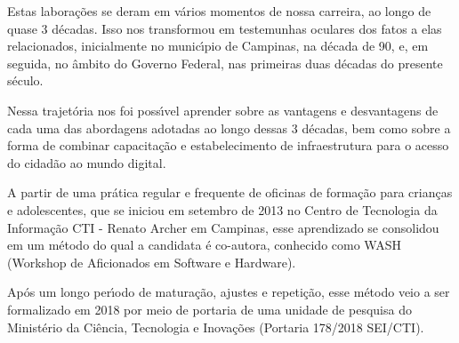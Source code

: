 \documentclass[
12pt,		%
openright,	%
twoside,  %
a4paper,			%
chapter=TITLE,		%
english,			%
french,				%
spanish,			%
brazil				%
]{USPSC-classe/USPSC}
\begin{document}
Estas labora\c{c}\~oes  se deram em v\'arios momentos de nossa carreira, ao longo de quase 3 d\'ecadas. Isso nos transformou em testemunhas oculares dos fatos a elas relacionados, inicialmente no  munic\'{\i}pio de Campinas, na d\'ecada de 90, e, em seguida, no \^ambito do Governo Federal, nas primeiras duas d\'ecadas do presente s\'eculo.

















Nessa trajet\'oria nos foi poss\'{\i}vel aprender sobre as vantagens e desvantagens de cada uma das abordagens adotadas ao longo dessas 3 d\'ecadas, bem como sobre a forma de combinar capacita\c{c}\~ao e estabelecimento de infraestrutura para o acesso do cidad\~ao ao mundo digital.

















A partir de uma pr\'atica regular e frequente de oficinas de forma\c{c}\~ao para  crian\c{c}as e adolescentes, que se iniciou em setembro de 2013 no Centro de Tecnologia da Informa\c{c}\~ao CTI - Renato Archer em Campinas, esse aprendizado se consolidou em um m\'etodo do qual a candidata \'e co-autora, conhecido como WASH (Workshop de Aficionados em Software e Hardware).

















Ap\'os um longo per\'{\i}odo de matura\c{c}\~ao, ajustes e repeti\c{c}\~ao, esse m\'etodo veio a ser formalizado em 2018 por meio de portaria de uma unidade de pesquisa do Minist\'erio da Ci\^encia, Tecnologia e Inova\c{c}\~oes (Portaria 178/2018 SEI/CTI).
\end{document}
